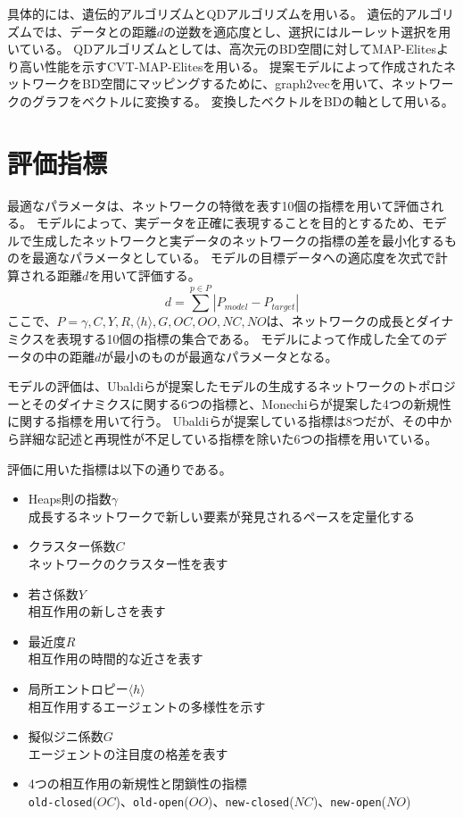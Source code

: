 \documentclass[uplatex,11pt,openany]{ujreport}
\begin{document}
        具体的には、遺伝的アルゴリズムとQDアルゴリズムを用いる。
        遺伝的アルゴリズムでは、データとの距離$d$の逆数を適応度とし、選択にはルーレット選択を用いている。
        QDアルゴリズムとしては、高次元のBD空間に対してMAP-Elitesより高い性能を示すCVT-MAP-Elitesを用いる。
        提案モデルによって作成されたネットワークをBD空間にマッピングするために、graph2vecを用いて、ネットワークのグラフをベクトルに変換する。
        変換したベクトルをBDの軸として用いる。


    \section{評価指標}
        最適なパラメータは、ネットワークの特徴を表す10個の指標を用いて評価される。
        モデルによって、実データを正確に表現することを目的とするため、モデルで生成したネットワークと実データのネットワークの指標の差を最小化するものを最適なパラメータとしている。
        モデルの目標データへの適応度を次式で計算される距離$d$を用いて評価する。
        \begin{equation}
            d = \sum^{p\in P}|P_{model}-P_{target}|
        \end{equation}
        ここで、$P={\gamma,C,Y,R, \langle h\rangle ,G,OC,OO,NC,NO}$は、ネットワークの成長とダイナミクスを表現する10個の指標の集合である。
        モデルによって作成した全てのデータの中の距離$d$が最小のものが最適なパラメータとなる。

        モデルの評価は、Ubaldiらが提案したモデルの生成するネットワークのトポロジーとそのダイナミクスに関する6つの指標\cite{ubaldiEmergenceEvolutionSocial2021}と、Monechiらが提案した4つの新規性に関する指標\cite{monechiWavesNoveltiesExpansion2017}を用いて行う。
        Ubaldiらが提案している指標は8つだが、その中から詳細な記述と再現性が不足している指標を除いた6つの指標を用いている。

        評価に用いた指標は以下の通りである。
        \begin{itemize}
            \item Heaps則の指数$\gamma$\\成長するネットワークで新しい要素が発見されるペースを定量化する
            \item クラスター係数$C$\\ネットワークのクラスター性を表す
            \item 若さ係数$Y$\\相互作用の新しさを表す
            \item 最近度$R$\\相互作用の時間的な近さを表す
            \item 局所エントロピー$\langle h\rangle$\\相互作用するエージェントの多様性を示す
            \item 擬似ジニ係数$G$\\エージェントの注目度の格差を表す
            \item 4つの相互作用の新規性と閉鎖性の指標\\\verb|old-closed|($OC$)、\verb|old-open|($OO$)、\verb|new-closed|($NC$)、\verb|new-open|($NO$)
        \end{itemize}
\end{document}
